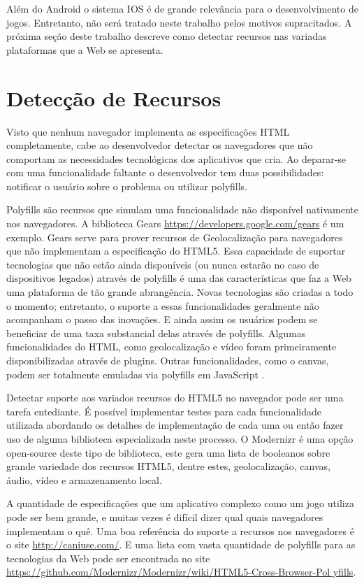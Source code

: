Além do Android o sistema IOS é de grande relevância
para o desenvolvimento de jogos. Entretanto, não será tratado neste
trabalho pelos motivos supracitados. A próxima seção deste trabalho
descreve como detectar recursos nas variadas plataformas que a Web se
apresenta.

\section{Detecção de Recursos}
Visto que nenhum navegador implementa as especificações HTML
completamente, cabe ao desenvolvedor detectar os navegadores que não
comportam as necessidades tecnológicas dos aplicativos que cria. Ao
deparar-se com uma funcionalidade faltante o desenvolvedor tem duas
possibilidades: notificar o usuário sobre o problema ou utilizar
polyfills.

Polyfills são recursos que simulam uma funcionalidade não
disponível nativamente nos navegadores. A biblioteca Gears
\url{https://developers.google.com/gears} é um exemplo. Gears
serve para prover recursos de Geolocalização para navegadores que
não implementam a especificação do HTML5. Essa capacidade de
suportar tecnologias que não estão ainda disponíveis (ou nunca
estarão no caso de dispositivos legados) através de polyfills é
uma das características que faz a Web uma plataforma de tão grande
abrangência. Novas tecnologias são criadas a todo o momento;
entretanto, o suporte a essas funcionalidades geralmente não
acompanham o passo das inovações. E ainda assim os usuários podem
se beneficiar de uma taxa substancial delas através de polyfills.
Algumas funcionalidades do HTML, como geolocalização e vídeo
foram primeiramente disponibilizadas através de plugins. Outras
funcionalidades, como o canvas, podem ser totalmente emuladas via
polyfills em JavaScript \autocite{diveIntohtml}.

Detectar suporte aos variados recursos do HTML5 no navegador
pode ser uma tarefa entediante. É possível implementar testes para
cada funcionalidade utilizada abordando os detalhes de implementação
de cada uma ou então fazer uso de alguma biblioteca especializada
neste processo. O Modernizr é uma opção open-source deste tipo de
biblioteca, este gera uma lista de booleanos sobre grande variedade dos
recursos HTML5, dentre estes, geolocalização, canvas, áudio, vídeo e
armazenamento local.

A quantidade de especificações que um aplicativo complexo
como um jogo utiliza pode ser bem grande, e muitas vezes é
difícil dizer qual quais navegadores implementam o quê. Uma
boa referência do suporte a recursos nos navegadores é o site
\url{http://caniuse.com/}. E uma lista com vasta quantidade de
polyfills para as tecnologias da Web pode ser encontrada no site
\url{https://github.com/Modernizr/Modernizr/wiki/HTML5-Cross-Browser-Pol
yfills}.

